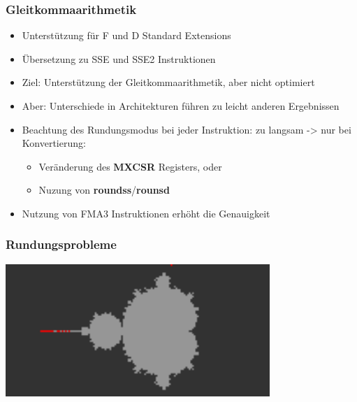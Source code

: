 \begin{frame}
    \frametitle{Gleitkommaarithmetik}
    \begin{itemize}
        \setlength{\itemsep}{1em}
        \item Unterstützung für F und D Standard Extensions
        \item Übersetzung zu SSE und SSE2 Instruktionen
        \item Ziel: Unterstützung der Gleitkommaarithmetik, aber nicht optimiert
        \item Aber: Unterschiede in Architekturen führen zu leicht anderen Ergebnissen
        \item Beachtung des Rundungsmodus bei jeder Instruktion: zu langsam -> nur bei Konvertierung:
              \begin{itemize}
                  \item Veränderung des \textbf{MXCSR} Registers, oder
                  \item Nuzung von \textbf{roundss}/\textbf{rounsd}
              \end{itemize}
        \item Nutzung von FMA3 Instruktionen erhöht die Genauigkeit
    \end{itemize}
\end{frame}
\clearpage

\begin{frame}
    \frametitle{Rundungsprobleme}
    \centering
    \includegraphics[width=0.75\textwidth]{img/translated_diff.png}
\end{frame}

\clearpage

